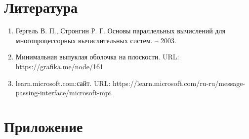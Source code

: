 \documentclass{report}
\begin{document}
\section*{Литература}
\begin{enumerate}
\item Гергель В. П., Стронгин Р. Г. Основы параллельных вычислений для многопроцессорных вычислительных систем. – 2003.
\item Минимальная выпуклая оболочка на плоскости. \newline URL: https://grafika.me/node/161
\item learn.microsoft.com:сайт. \newline URL: https://learn.microsoft.com/ru-ru/message-passing-interface/microsoft-mpi.
\end{enumerate} 
\newpage

\section*{Приложение}
\end{document}
